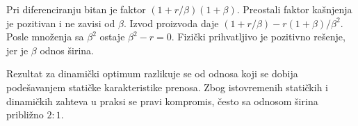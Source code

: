 Pri diferenciranju bitan je faktor $(1+r/\beta)(1+\beta)$. Preostali faktor kašnjenja je pozitivan i ne zavisi od $\beta$. Izvod proizvoda daje $(1+r/\beta)-r(1+\beta)/\beta^2$. Posle množenja sa $\beta^2$ ostaje $\beta^2-r=0$. Fizički prihvatljivo je pozitivno rešenje, jer je $\beta$ odnos širina.

Rezultat za dinamički optimum razlikuje se od odnosa koji se dobija podešavanjem statičke karakteristike prenosa. Zbog istovremenih statičkih i dinamičkih zahteva u praksi se pravi kompromis, često sa odnosom širina približno $2:1$.
